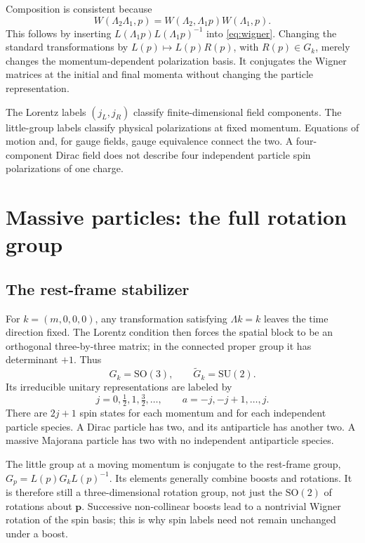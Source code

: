 \documentclass[11pt]{article}
\newcommand{\SO}{\mathrm{SO}}
\newcommand{\SU}{\mathrm{SU}}
\begin{document}
Composition is consistent because
\begin{equation}
 W(\Lambda_2\Lambda_1,p)
  =W(\Lambda_2,\Lambda_1p)W(\Lambda_1,p).
 \label{eq:cocycle}
\end{equation}
This follows by inserting
\(L(\Lambda_1p)L(\Lambda_1p)^{-1}\) into \eqref{eq:wigner}.
Changing the standard transformations by
\(L(p)\mapsto L(p)R(p)\), with \(R(p)\in G_k\), merely changes
the momentum-dependent polarization basis. It conjugates the Wigner
matrices at the initial and final momenta without changing the
particle representation.

\begin{keyidea}
The Lorentz labels \((j_L,j_R)\) classify finite-dimensional field
components. The little-group labels classify physical polarizations
at fixed momentum. Equations of motion and, for gauge fields, gauge
equivalence connect the two. A four-component Dirac field does not
describe four independent particle spin polarizations of one charge.
\end{keyidea}

\section{Massive particles: the full rotation group}
\subsection{The rest-frame stabilizer}
For \(k=(m,0,0,0)\), any transformation satisfying \(\Lambda k=k\)
leaves the time direction fixed. The Lorentz condition then forces
the spatial block to be an orthogonal three-by-three matrix; in the
connected proper group it has determinant \(+1\). Thus
\begin{equation}
 G_k=\SO(3),\qquad \widetilde G_k=\SU(2).
 \label{eq:massivelittle}
\end{equation}
Its irreducible unitary representations are labeled by
\begin{equation}
 j=0,\tfrac12,1,\tfrac32,\ldots,\qquad a=-j,-j+1,\ldots,j.
 \label{eq:massivespin}
\end{equation}
There are \(2j+1\) spin states for each momentum and for each
independent particle species. A Dirac particle has two, and its
antiparticle has another two. A massive Majorana particle has two
with no independent antiparticle species.

The little group at a moving momentum is conjugate to the rest-frame
group, \(G_p=L(p)G_kL(p)^{-1}\). Its elements generally combine
boosts and rotations. It is therefore still a three-dimensional
rotation group, not just the \(\SO(2)\) of rotations about \(\bm p\).
Successive non-collinear boosts lead to a nontrivial Wigner rotation
of the spin basis; this is why spin labels need not remain unchanged
under a boost.
\end{document}
